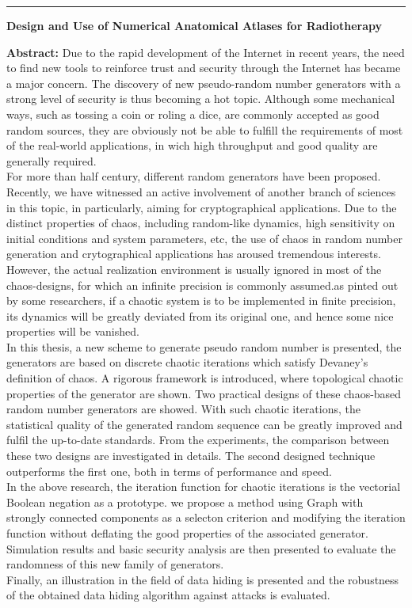 \documentclass[a4paper,11pt,twoside]{ThesisStyle}
\begin{document}
\cleardoublepage
\begin{vcenterpage}
\noindent\rule[2pt]{\textwidth}{0.5pt}
\begin{center}
{\large\textbf{Design and Use of Numerical Anatomical Atlases for Radiotherapy\\}}
\end{center}
{\large\textbf{Abstract:}}
Due to the rapid development of the Internet in recent years, the need to find new tools to reinforce trust and security through the Internet has became a major concern. The discovery of new pseudo-random number generators with a strong level of security is thus becoming a hot topic. Although some mechanical ways, such as tossing a coin or roling a dice, are commonly accepted as good random sources, they are obviously not be able to fulfill the requirements of most of the real-world applications, in wich high throughput and good quality are generally required.\\
For more than half century, different random generators have been proposed. Recently, we have witnessed an active involvement of another branch of sciences in this topic, in particularly, aiming for cryptographical applications. Due to the distinct properties of chaos, including random-like dynamics, high sensitivity on initial conditions and system parameters, etc, the use of chaos in random number generation and crytographical applications has aroused tremendous interests.\\
However, the actual realization environment is usually ignored in most of the chaos-designs, for which an infinite precision is commonly assumed.as pinted out by some researchers, if a chaotic system is to be implemented in finite precision, its dynamics will be greatly deviated from its original one, and hence some nice properties will be vanished.\\
In this thesis, a new scheme to generate pseudo random number is presented, the generators are based on discrete chaotic iterations which satisfy Devaney's definition of chaos. A rigorous framework is introduced, where topological chaotic properties of the generator are shown. Two practical designs of these chaos-based random number generators are showed. With such chaotic iterations, the statistical quality of the generated random sequence can be greatly improved and fulfil the up-to-date standards. From the experiments, the comparison between these two designs are investigated in details. The second designed technique outperforms the first one, both in terms of performance and speed.\\
In the above research, the iteration function for chaotic iterations is the vectorial Boolean negation as a prototype. we propose a method using Graph with strongly connected components as a selecton criterion and modifying the iteration function without deflating the good properties of the associated generator.
Simulation results and basic security analysis are then presented
to evaluate the randomness of this new family of generators.\\
Finally, an illustration in the field of data hiding is presented and the robustness of the obtained data hiding algorithm against attacks is evaluated.


\end{vcenterpage}
\end{document}
